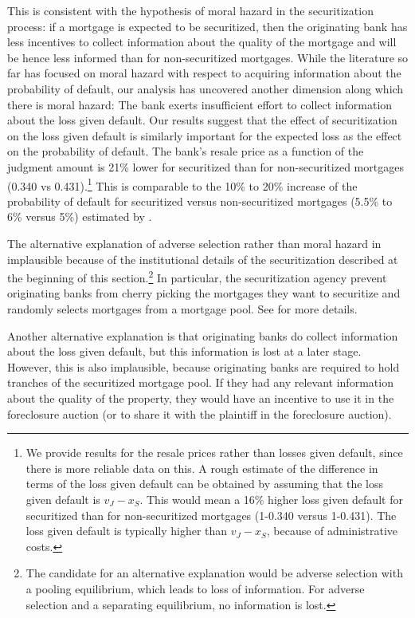 \documentclass[11pt,twopage]{article}
\begin{document}
This is consistent with the hypothesis of moral hazard in the securitization process: if a mortgage is expected to be securitized, then the originating bank has less incentives to collect information about the quality of the mortgage and will be hence less informed than for non-securitized mortgages. While the literature so far has focused on moral hazard with respect to acquiring information about the probability of default, our analysis has uncovered another dimension along which there is moral hazard: The bank exerts insufficient effort to collect information about the loss given default. Our results suggest that the effect of securitization on the loss given default is similarly important for the expected loss as the effect on the probability of default. The bank's resale price as a function of the judgment amount is 21\% lower for securitized than for non-securitized mortgages (0.340 vs 0.431).\footnote{We provide results for the resale prices rather than losses given default, since there is more reliable data on this. A rough estimate of the difference in terms of the loss given default can be obtained by assuming that the loss given default is $v_J-x_S$. This would mean a 16\% higher loss given default for securitized than for non-securitized mortgages (1-0.340 versus 1-0.431). The loss given default is typically higher than $v_J-x_S$, because of administrative costs.} This is comparable to the 10\% to 20\% increase of the probability of default for securitized versus non-securitized mortgages (5.5\% to 6\% versus 5\%) estimated by \cite{keys2008did}.

The alternative explanation of adverse selection rather than moral hazard in implausible because of the institutional details of the securitization described at the beginning of this section.\footnote{The candidate for an alternative explanation would be adverse selection with a pooling equilibrium, which leads to loss of information. For adverse selection and a separating equilibrium, no information is lost.} In particular, the securitization agency prevent originating banks from cherry picking the mortgages they want to securitize and randomly selects mortgages from a mortgage pool. See \cite{keys2008did} for more details.

Another alternative explanation is that originating banks do collect information about the loss given default, but this information is lost at a later stage. However, this is also implausible, because originating banks are required to hold tranches of the securitized mortgage pool. If they had any relevant information about the quality of the property, they would have an incentive to use it in the foreclosure auction (or to share it with the plaintiff in the foreclosure auction).
\end{document}
